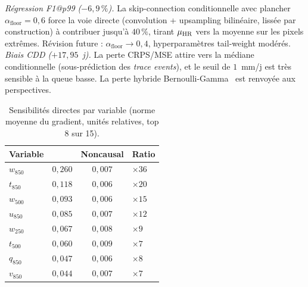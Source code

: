 {}
\label{annexe:diags-metriques}
\mySaveMarks

\label{ssec:exp-annexe-diags}

\emph{Régression F1@p99 ($-6{,}9\,\%$).} La skip-connection conditionnelle avec plancher $\alpha_{\mathrm{floor}}=0{,}6$ force la voie directe (convolution + upsampling bilinéaire, lissée par construction) à contribuer jusqu'à $40\,\%$, tirant $\mu_{\text{HR}}$ vers la moyenne \LR{} sur les pixels extrêmes. Révision future : $\alpha_{\mathrm{floor}}\to 0{,}4$, hyperparamètres tail-weight modérés. \emph{Biais CDD ($+17{,}95$~j).} La perte CRPS/MSE attire vers la médiane conditionnelle (sous-prédiction des \emph{trace events}), et le seuil de $1$~mm/j est très sensible à la queue basse. La perte hybride Bernoulli-Gamma~\cite{maraun_widmann_2018} est renvoyée aux perspectives.

\label{ssec:exp-annexe-sens}

\begin{table}[ht]
  \centering
  \small
  \caption[Sensibilités directes par variable]{Sensibilités directes par variable \LR{} (norme moyenne du gradient, unités relatives, top 8 sur 15).}
  \label{tab:exp-res-sens}
  \begin{tabularx}{\linewidth}{l c c X}
    \toprule
    \textbf{Variable} & \Oracle{} & \textbf{Noncausal} & \textbf{Ratio} \\
    \midrule
    $w_{850}$ & $0{,}260$ & $0{,}007$ & $\times 36$ \\
    $t_{850}$ & $0{,}118$ & $0{,}006$ & $\times 20$ \\
    $w_{500}$ & $0{,}093$ & $0{,}006$ & $\times 15$ \\
    $u_{850}$ & $0{,}085$ & $0{,}007$ & $\times 12$ \\
    $w_{250}$ & $0{,}067$ & $0{,}008$ & $\times 9$ \\
    $t_{500}$ & $0{,}060$ & $0{,}009$ & $\times 7$ \\
    $q_{850}$ & $0{,}047$ & $0{,}006$ & $\times 8$ \\
    $v_{850}$ & $0{,}044$ & $0{,}007$ & $\times 7$ \\
    \bottomrule
  \end{tabularx}
\end{table}

